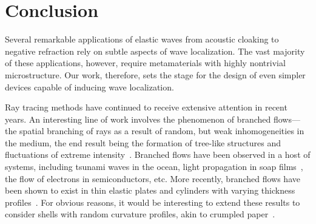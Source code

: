 
\chapter{Conclusion}

Several remarkable applications of elastic waves from acoustic cloaking to negative refraction rely on subtle aspects of wave localization.
The vast majority of these applications, however, require metamaterials with highly nontrivial microstructure.
Our work, therefore, sets the stage for the design of even simpler devices capable of inducing wave localization.

Ray tracing methods have continued to receive extensive attention in recent years.
An interesting line of work involves the phenomenon of branched flows---the spatial branching of rays as a result of random, but weak inhomogeneities in the medium, the end result being the formation of tree-like structures and fluctuations of extreme intensity~\cite{heller2021}.
Branched flows have been observed in a host of systems, including tsunami waves in the ocean, light propagation in soap films~\cite{patsyk2020}, the flow of electrons in semiconductors, etc.
More recently, branched flows have been shown to exist in thin elastic plates and cylinders with varying thickness profiles~\cite{jose2022,jose2023}.
For obvious reasons, it would be interesting to extend these results to consider shells with random curvature profiles, akin to crumpled paper~\cite{gopinathan2002}.
